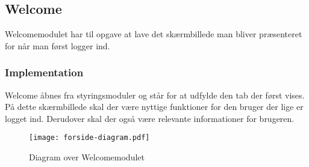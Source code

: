\subsection{Welcome}
\label{sub:Welcome}


Welcomemodulet har til opgave at lave det skærmbillede man bliver præsenteret for når man først logger ind.

\subsubsection{Implementation}
\label{ssub:Welcome_implementation}
Welcome åbnes fra styringsmoduler og står for at udfylde den tab der først vises. På dette skærmbillede skal der være nyttige funktioner for den bruger der lige er logget ind. Derudover skal der også være relevante informationer for brugeren.

\begin{figure}
  \centering
  \texttt{[image: forside-diagram.pdf]}
  \caption{Diagram over Welcomemodulet}
  \label{fig:forsidemod}
\end{figure}
